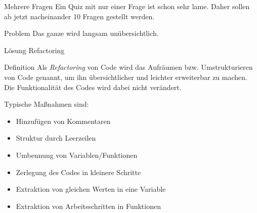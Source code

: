 \begin{frame}
	
\begin{block}{Mehrere Fragen}
\vspace{2pt}
Ein Quiz mit nur einer Frage ist schon sehr lame. Daher sollen ab jetzt nacheinander 10 Fragen gestellt werden. 	
\end{block}

\pause 
\vspace{12pt}

\begin{alertblock}{Problem}
\vspace{2pt}
Das ganze wird langsam unübersichtlich.	
\end{alertblock}

\pause
\vspace{12pt}
\begin{exampleblock}{Lösung}
	\vspace{2pt}
Refactoring
\end{exampleblock}

\end{frame}

\begin{frame}
\begin{block}{Definition}
\vspace{2pt}
Als \emph{Refactoring} von Code wird das Aufräumen bzw. Umstrukturieren von Code genannt, um ihn übersichtlicher und leichter erweiterbar zu machen. 
Die Funktionalität des Codes wird dabei nicht verändert. 
\pause

Typische Maßnahmen sind: 
\pause 
\begin{itemize}[<+->]
	\item Hinzufügen von Kommentaren
	\item Struktur durch Leerzeilen
	\item Umbennung von Variablen/Funktionen
	\item Zerlegung des Codes in kleinere Schritte
	\item Extraktion von gleichen Werten in eine Variable
	\item Extraktion von Arbeitsschritten in Funktionen
\end{itemize}
\end{block}
\end{frame}



